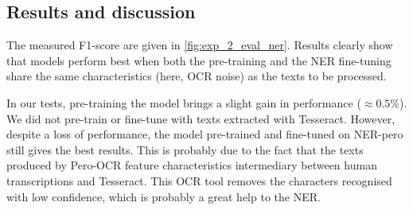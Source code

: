 



\subsection{Results and discussion}
The measured F1-score are given in \cref{fig:exp_2_eval_ner}.
Results clearly show that models perform best when both the pre-training and the NER fine-tuning share the same characteristics (here, OCR noise) as the texts to be processed.

In our tests, pre-training the model brings a slight gain in performance ($\approx 0.5\%$).
We did not pre-train or fine-tune with texts extracted with Tesseract.
However, despite a loss of performance, the model pre-trained and fine-tuned on NER-pero still gives the best results.
This is probably due to the fact that the texts produced by Pero-OCR feature characteristics intermediary between human transcriptions and Tesseract.
This OCR tool removes the characters recognised with low confidence, which is probably a great help to the NER.

